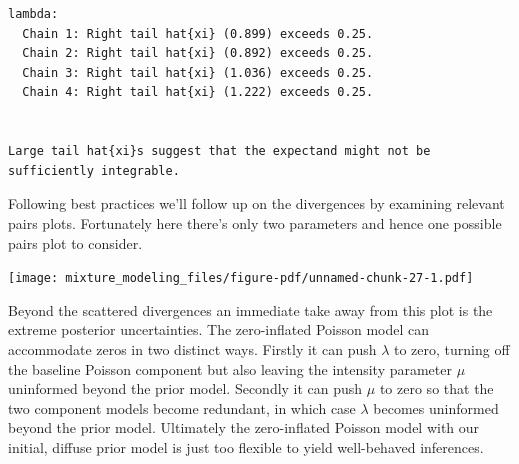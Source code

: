 \documentclass[
  letterpaper,
  DIV=11,
  numbers=noendperiod]{scrartcl}
\newenvironment{Shaded}{\begin{snugshade}}{\end{snugshade}}
\newcommand{\AttributeTok}[1]{\textcolor[rgb]{0.40,0.45,0.13}{#1}}
\newcommand{\FunctionTok}[1]{\textcolor[rgb]{0.28,0.35,0.67}{#1}}
\newcommand{\NormalTok}[1]{\textcolor[rgb]{0.00,0.23,0.31}{#1}}
\newcommand{\OtherTok}[1]{\textcolor[rgb]{0.00,0.23,0.31}{#1}}
\newcommand{\SpecialCharTok}[1]{\textcolor[rgb]{0.37,0.37,0.37}{#1}}
\newcommand{\StringTok}[1]{\textcolor[rgb]{0.13,0.47,0.30}{#1}}
\begin{document}
\begin{Shaded}
\end{Shaded}

\begin{verbatim}
lambda:
  Chain 1: Right tail hat{xi} (0.899) exceeds 0.25.
  Chain 2: Right tail hat{xi} (0.892) exceeds 0.25.
  Chain 3: Right tail hat{xi} (1.036) exceeds 0.25.
  Chain 4: Right tail hat{xi} (1.222) exceeds 0.25.


Large tail hat{xi}s suggest that the expectand might not be
sufficiently integrable.
\end{verbatim}

Following best practices we'll follow up on the divergences by examining
relevant pairs plots. Fortunately here there's only two parameters and
hence one possible pairs plot to consider.

\begin{Shaded}
\end{Shaded}

\texttt{[image: mixture\_modeling\_files/figure-pdf/unnamed-chunk-27-1.pdf]}

Beyond the scattered divergences an immediate take away from this plot
is the extreme posterior uncertainties. The zero-inflated Poisson model
can accommodate zeros in two distinct ways. Firstly it can push
\(\lambda\) to zero, turning off the baseline Poisson component but also
leaving the intensity parameter \(\mu\) uninformed beyond the prior
model. Secondly it can push \(\mu\) to zero so that the two component
models become redundant, in which case \(\lambda\) becomes uninformed
beyond the prior model. Ultimately the zero-inflated Poisson model with
our initial, diffuse prior model is just too flexible to yield
well-behaved inferences.
\end{document}
